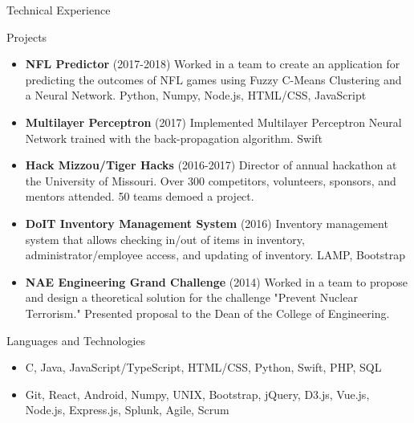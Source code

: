\documentclass[]{mcdowellcv}
\begin{document}
    \begin{cvsection}{Technical Experience}
        \begin{cvsubsection}{Projects}{}{}
            \begin{itemize}
               \item \textbf{NFL Predictor} (2017-2018) Worked in a team to create an application for predicting the outcomes of NFL games using Fuzzy C-Means Clustering and a Neural Network. Python, Numpy, Node.js, HTML/CSS, JavaScript
                \item \textbf{Multilayer Perceptron} (2017) Implemented Multilayer Perceptron Neural Network trained with the back-propagation algorithm. Swift
                \item \textbf{Hack Mizzou/Tiger Hacks} (2016-2017) Director of annual hackathon at the University of Missouri. Over 300 competitors, volunteers, sponsors, and mentors attended. 50 teams demoed a project.
                \item \textbf{DoIT Inventory Management System} (2016) Inventory management system that allows checking in/out of items in inventory, administrator/employee access, and updating of inventory. LAMP, Bootstrap
                \item \textbf{NAE Engineering Grand Challenge} (2014) Worked in a team to propose and design a theoretical solution for the challenge "Prevent Nuclear Terrorism." Presented proposal to the Dean of the College of Engineering.
            \end{itemize}
        \end{cvsubsection}

        \begin{cvsubsection}{Languages and Technologies}{}{}
            \begin{itemize}
                \item C, Java, JavaScript/TypeScript, HTML/CSS, Python, Swift, PHP, SQL
                \item Git, React, Android, Numpy, UNIX, Bootstrap, jQuery, D3.js, Vue.js, Node.js, Express.js, Splunk, Agile, Scrum
            \end{itemize}
        \end{cvsubsection}
    \end{cvsection}
    
\end{document}
